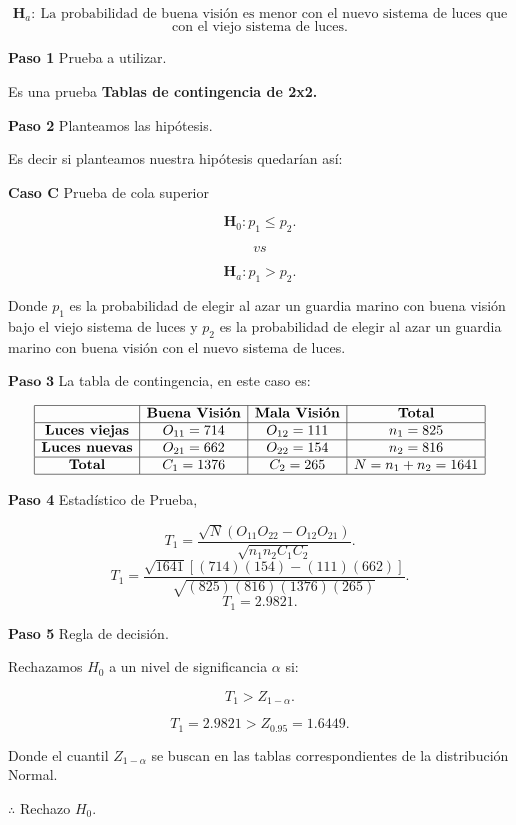 \documentclass[
  a4paper,
  oneside,
  openany]{book}
\begin{document}
\[\textbf{H}_a: \ \mbox{La probabilidad de buena visión es menor con el nuevo sistema de luces que}\]
\[\mbox{con el viejo sistema de luces.}\]

\textbf{Paso 1} Prueba a utilizar.

Es una prueba \textbf{Tablas de contingencia de 2x2.}

\textbf{Paso 2} Planteamos las hipótesis.

Es decir si planteamos nuestra hipótesis quedarían así:

\textbf{Caso C} Prueba de cola superior

\[\textbf{H}_0: p_{1} \leq p_{2}.\]

\[vs\]

\[\textbf{H}_a: p_{1} > p_{2}.\]

Donde \(p_{1}\) es la probabilidad de elegir al azar un guardia marino con buena visión bajo el viejo sistema de luces y \(p_{2}\) es la probabilidad de elegir al azar un guardia marino con buena visión con el nuevo sistema de luces.

\(\textbf{Paso 3}\) La tabla de contingencia, en este caso es:

\[
\begin{array}{|c|c|c|c|}
\hline
 & \textbf{Buena Visión} & \textbf{Mala Visión} & \textbf{Total}   \\
\hline
\textbf{Luces viejas} & O_{11}= 714 & O_{12}=111 & n_{1}=825   \\
\hline
\textbf{Luces nuevas} & O_{21}=662 & O_{22}=154 & n_{2}=816\\
\hline
\textbf{Total}  & C_{1}=1376 & C_{2}=265   & N=n_{1}+n_{2}=1641 \\
\hline
\end{array}
\]

\textbf{Paso 4} Estadístico de Prueba,

\[T_{1}=\frac{\sqrt{N}(O_{11}O_{22}-O_{12}O_{21})}{\sqrt{n_{1}n_{2}C_{1}C_{2}}}.\]
\[T_{1}=\frac{\sqrt{1641}[(714)(154)-(111)(662)]}{\sqrt{(825)(816)(1376)(265)}}.\]
\[T_{1}= 2.9821.\]

\textbf{Paso 5} Regla de decisión.

Rechazamos \(H_0\) a un nivel de significancia \(\alpha\) si:

\[T_{1} > Z_{1-\alpha}.\]

\[T_{1}=2.9821 > Z_{0.95}= 1.6449.\]

Donde el cuantil \(Z_{1-\alpha}\) se buscan en las tablas correspondientes de la distribución Normal.

\(\therefore\) Rechazo \(H_0\).
\end{document}
